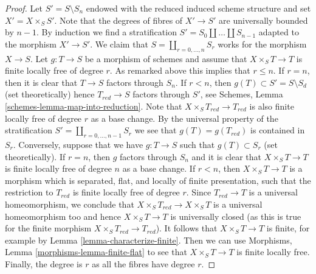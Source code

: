 \begin{proof}
\medskip\noindent
Let $S' = S \setminus S_n$ endowed with the reduced induced scheme
structure and set $X' = X \times_S S'$. Note that the degrees of fibres
of $X' \to S'$ are universally bounded by $n - 1$. By induction we find a
stratification $S' = S_0 \amalg \ldots \amalg S_{n - 1}$ adapted
to the morphism $X' \to S'$. We claim that $S = \coprod_{r = 0, \ldots, n} S_r$
works for the morphism $X \to S$. Let $g : T \to S$ be a morphism of schemes
and assume that $X \times_S T \to T$ is finite locally free of degree $r$.
As remarked above this implies that $r \leq n$. If $r = n$, then it is
clear that $T \to S$ factors through $S_n$. If $r < n$, then
$g(T) \subset S' = S \setminus S_d$ (set theoretically) hence
$T_{red} \to S$ factors through $S'$, see
Schemes, Lemma \ref{schemes-lemma-map-into-reduction}.
Note that $X \times_S T_{red} \to T_{red}$ is also
finite locally free of degree $r$ as a base change.
By the universal property of the stratification
$S' = \coprod_{r = 0, \ldots, n - 1} S_r$ we see that $g(T) = g(T_{red})$
is contained in $S_r$.
Conversely, suppose that we have $g : T \to S$ such that
$g(T) \subset S_r$ (set theoretically).
If $r = n$, then $g$ factors through $S_n$ and
it is clear that $X \times_S T \to T$
is finite locally free of degree $n$ as a base change.
If $r < n$, then $X \times_S T \to T$ is a morphism which is
separated, flat, and locally of finite presentation, such that
the restriction to $T_{red}$ is finite locally free of degree $r$.
Since $T_{red} \to T$ is a universal homeomorphism, we conclude
that $X \times_S T_{red} \to X \times_S T$ is a universal homeomorphism
too and hence $X \times_S T \to T$ is universally closed (as this
is true for the finite morphism $X \times_S T_{red} \to T_{red}$).
It follows that $X \times_S T \to T$ is finite, for example by
Lemma \ref{lemma-characterize-finite}. Then we can use
Morphisms, Lemma \ref{morphisms-lemma-finite-flat}
to see that $X \times_S T \to T$ is finite locally free.
Finally, the degree is $r$ as all the fibres have degree $r$.
\end{proof}